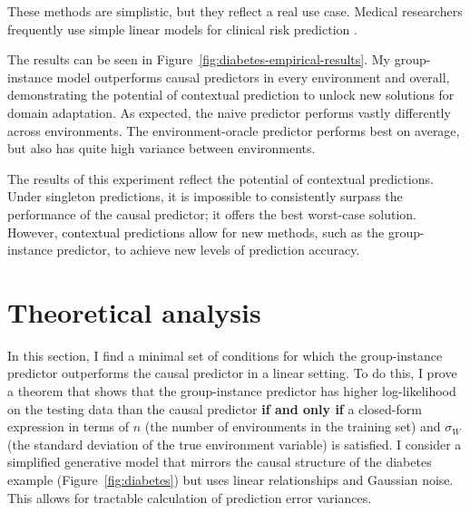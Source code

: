 \documentclass[../thesis.tex]{subfiles}
\begin{document}
These methods are simplistic, but they reflect a real use case. Medical researchers frequently use simple linear models for clinical risk prediction \citep{nobleRiskModelsScores2011}. 

The results can be seen in Figure~\ref{fig:diabetes-empirical-results}. My group-instance model outperforms causal predictors in every environment and overall, demonstrating the potential of contextual prediction to unlock new solutions for domain adaptation. As expected, the naive predictor performs vastly differently across environments. The environment-oracle predictor performs best on average, but also has quite high variance between environments.

The results of this experiment reflect the potential of contextual predictions. Under singleton predictions, it is impossible to consistently surpass the performance of the causal predictor; it offers the best worst-case solution. However, contextual predictions allow for new methods, such as the group-instance predictor, to achieve new levels of prediction accuracy.

\section{Theoretical analysis}
\label{sec:theory-comparison}

In this section, I find a minimal set of conditions for which the group-instance predictor outperforms the causal predictor in a linear setting. To do this, I prove a theorem that shows that the group-instance predictor has higher log-likelihood on the testing data than the causal predictor \textbf{if and only if} a closed-form expression in terms of $n$ (the number of environments in the training set) and $\sigma_W$ (the standard deviation of the true environment variable) is satisfied. I consider a simplified generative model that mirrors the causal structure of the diabetes example (Figure~\ref{fig:diabetes}) but uses linear relationships and Gaussian noise. This allows for tractable calculation of prediction error variances.
\end{document}
